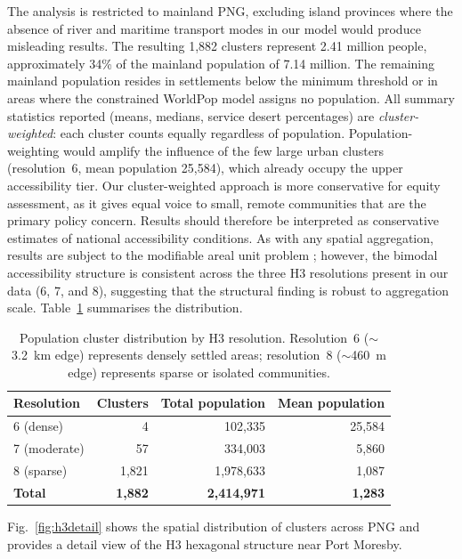 \documentclass[review,3p,authoryear]{elsarticle}
\begin{document}
The analysis is restricted to mainland PNG, excluding island provinces where the absence of river and maritime transport modes in our model would produce misleading results. The resulting 1,882 clusters represent 2.41 million people, approximately 34\% of the mainland population of 7.14 million. The remaining mainland population resides in settlements below the minimum threshold or in areas where the constrained WorldPop model assigns no population. All summary statistics reported (means, medians, service desert percentages) are \textit{cluster-weighted}: each cluster counts equally regardless of population. Population-weighting would amplify the influence of the few large urban clusters (resolution~6, mean population 25,584), which already occupy the upper accessibility tier. Our cluster-weighted approach is more conservative for equity assessment, as it gives equal voice to small, remote communities that are the primary policy concern. Results should therefore be interpreted as conservative estimates of national accessibility conditions. As with any spatial aggregation, results are subject to the modifiable areal unit problem \citep{openshaw1984}; however, the bimodal accessibility structure is consistent across the three H3 resolutions present in our data (6, 7, and 8), suggesting that the structural finding is robust to aggregation scale. Table~\ref{tab:resolution} summarises the distribution.

\begin{table}[!h]
\centering
\caption{Population cluster distribution by H3 resolution. Resolution~6 ($\sim$\SI{3.2}{\kilo\metre} edge) represents densely settled areas; resolution~8 ($\sim$\SI{460}{\metre} edge) represents sparse or isolated communities.}
\label{tab:resolution}
\begin{tabular}{@{}lrrr@{}}
\toprule
Resolution & Clusters & Total population & Mean population \\
\midrule
6 (dense)    & 4      & 102,335  & 25,584 \\
7 (moderate) & 57     & 334,003  & 5,860  \\
8 (sparse)   & 1,821  & 1,978,633 & 1,087  \\
\midrule
\textbf{Total} & \textbf{1,882} & \textbf{2,414,971} & \textbf{1,283} \\
\bottomrule
\end{tabular}
\end{table}

Fig.~\ref{fig:h3detail} shows the spatial distribution of clusters across PNG and provides a detail view of the H3 hexagonal structure near Port Moresby.
\end{document}
